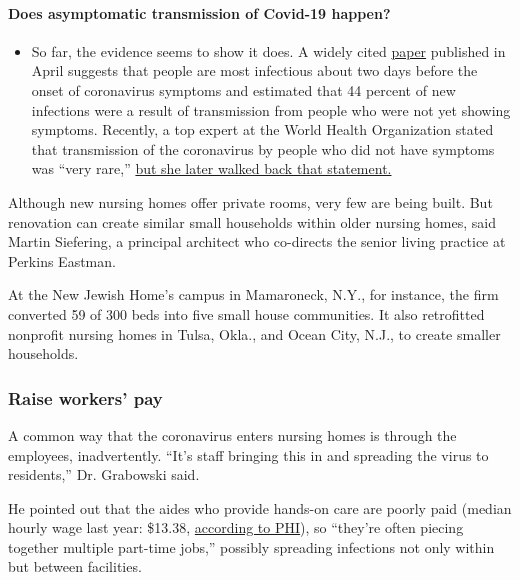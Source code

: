 \begin{itemize}
{  \paragraph{Does asymptomatic transmission of Covid-19
  happen?}\label{does-asymptomatic-transmission-of-covid-19-happen}}

  \begin{itemize}
  \tightlist
  \item
    So far, the evidence seems to show it does. A widely cited
    \href{https://www.nature.com/articles/s41591-020-0869-5}{paper}
    published in April suggests that people are most infectious about
    two days before the onset of coronavirus symptoms and estimated that
    44 percent of new infections were a result of transmission from
    people who were not yet showing symptoms. Recently, a top expert at
    the World Health Organization stated that transmission of the
    coronavirus by people who did not have symptoms was ``very rare,''
    \href{https://www.nytimes3xbfgragh.onion/2020/06/09/world/coronavirus-updates.html?action=click\&pgtype=Article\&state=default\&region=MAIN_CONTENT_3\&context=storylines_faq\#link-1f302e21}{but
    she later walked back that statement.}
  \end{itemize}
\end{itemize}

Although new nursing homes offer private rooms, very few are being
built. But renovation can create similar small households within older
nursing homes, said Martin Siefering, a principal architect who
co-directs the senior living practice at Perkins Eastman.

At the New Jewish Home's campus in Mamaroneck, N.Y., for instance, the
firm converted 59 of 300 beds into five small house communities. It also
retrofitted nonprofit nursing homes in Tulsa, Okla., and Ocean City,
N.J., to create smaller households.

\hypertarget{raise-workers-pay}{%
\subsubsection{\texorpdfstring{\textbf{Raise workers'
pay}}{Raise workers' pay}}\label{raise-workers-pay}}

A common way that the coronavirus enters nursing homes is through the
employees, inadvertently. ``It's staff bringing this in and spreading
the virus to residents,'' Dr. Grabowski said.

He pointed out that the aides who provide hands-on care are poorly paid
(median hourly wage last year: \$13.38,
\href{https://phinational.org/resource/u-s-nursing-assistants-employed-in-nursing-homes-key-facts-2019/}{according
to PHI}), so ``they're often piecing together multiple part-time jobs,''
possibly spreading infections not only within but between facilities.

